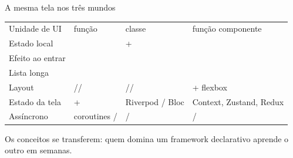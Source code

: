 \documentclass[aspectratio=169,10pt]{beamer}
\begin{document}
\begin{frame}{A mesma tela nos três mundos}
  \footnotesize
  \begin{tabularx}{\textwidth}{@{}l L L L@{}}
    \toprule
     &  &  &  \\
    \midrule
    Unidade de UI & função  & classe  & função componente \\
    Estado local &  &  +  &  \\
    Efeito ao entrar &  &  &  \\
    Lista longa &  &  &  \\
    Layout & // & // &  + flexbox \\
    Estado da tela &  +  & Riverpod / Bloc & Context, Zustand, Redux \\
    Assíncrono & coroutines /  &  /  &  /  \\
    \bottomrule
  \end{tabularx}
  \vspace{4pt}
  \begin{destaque}
    Os conceitos se transferem: quem domina um framework declarativo aprende o outro em semanas.
  \end{destaque}
\end{frame}
\end{document}
